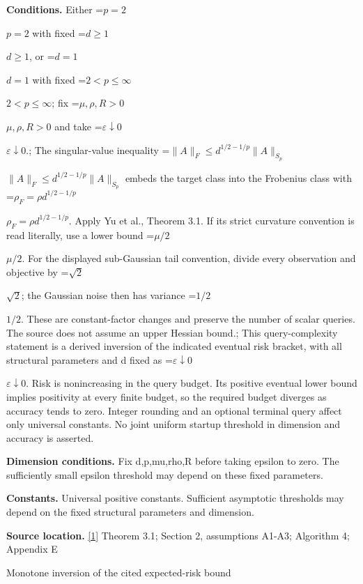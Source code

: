 \documentclass[10pt,a4paper]{article}
\newcommand{\AtlasMath}[1]{\par\begingroup\centering\setbox0=\hbox{$\displaystyle #1$}\ifdim\wd0>1.4\linewidth\typeout{ATLAS WIDE FORMULA: \the\wd0}\fi\ifdim\wd0>\linewidth\resizebox{\linewidth}{!}{\box0}\else\box0\fi\par\endgroup}
\newcommand{\AtlasInlineMath}[1]{\begingroup\setbox0=\hbox{$#1$}\ifdim\wd0>.4\linewidth\endgroup\AtlasMath{#1}\else\endgroup$#1$\fi}
\begin{document}
\textbf{Conditions.} Either \AtlasInlineMath{p=2} with fixed \AtlasInlineMath{d\ge1}, or \AtlasInlineMath{d=1} with fixed \AtlasInlineMath{2<p\le\infty}; fix \AtlasInlineMath{\mu,\rho,R>0} and take \AtlasInlineMath{\varepsilon\downarrow0}.; The singular-value inequality \AtlasInlineMath{\|A\|_F\le d^{1/2-1/p}\|A\|_{S_p}} embeds the target class into the Frobenius class with \AtlasInlineMath{\rho_F=\rho d^{1/2-1/p}}. Apply Yu et al., Theorem 3.1. If its strict curvature convention is read literally, use a lower bound \AtlasInlineMath{\mu/2}. For the displayed sub-Gaussian tail convention, divide every observation and objective by \AtlasInlineMath{\sqrt2}; the Gaussian noise then has variance \AtlasInlineMath{1/2}. These are constant-factor changes and preserve the number of scalar queries. The source does not assume an upper Hessian bound.; This query-complexity statement is a derived inversion of the indicated eventual risk bracket, with all structural parameters and d fixed as \AtlasInlineMath{\varepsilon\downarrow0}. Risk is nonincreasing in the query budget. Its positive eventual lower bound implies positivity at every finite budget, so the required budget diverges as accuracy tends to zero. Integer rounding and an optional terminal query affect only universal constants. No joint uniform startup threshold in dimension and accuracy is asserted.



\textbf{Dimension conditions.} Fix d,p,mu,rho,R before taking epsilon to zero. The sufficiently small epsilon threshold may depend on these fixed parameters.



\textbf{Constants.} Universal positive constants. Sufficient asymptotic thresholds may depend on the fixed structural parameters and dimension.



\textbf{Source location.} \href{https://papers.nips.cc/paper_files/paper/2024/file/b444ad72520a5f5c467343be88e352ed-Paper-Conference.pdf}{[1]} Theorem 3.1; Section 2, assumptions A1-A3; Algorithm 4; Appendix E



Monotone inversion of the cited expected-risk bound
\end{document}
